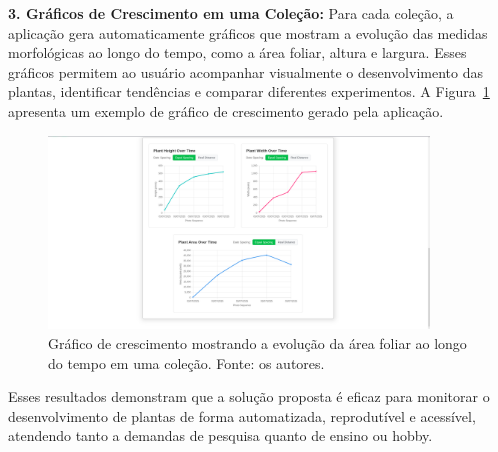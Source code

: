\textbf{3. Gráficos de Crescimento em uma Coleção:} Para cada coleção, a aplicação gera automaticamente gráficos que mostram a evolução das medidas morfológicas ao longo do tempo, como a área foliar, altura e largura. Esses gráficos permitem ao usuário acompanhar visualmente o desenvolvimento das plantas, identificar tendências e comparar diferentes experimentos. A Figura~\ref{fig:grafico-crescimento} apresenta um exemplo de gráfico de crescimento gerado pela aplicação.

\begin{figure}[H]
    \centering
    \includegraphics[width=0.9\textwidth]{../figures/screens/grafico-crescimento.png}
    \caption{Gráfico de crescimento mostrando a evolução da área foliar ao longo do tempo em uma coleção. Fonte: os autores.}
    \label{fig:grafico-crescimento}
\end{figure}

Esses resultados demonstram que a solução proposta é eficaz para monitorar o desenvolvimento de plantas de forma automatizada, reprodutível e acessível, atendendo tanto a demandas de pesquisa quanto de ensino ou hobby.


